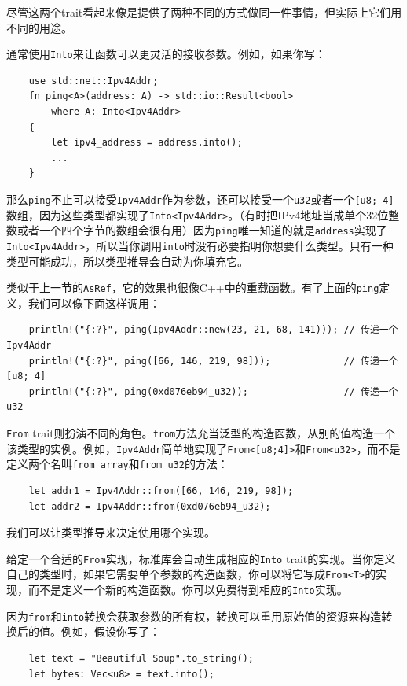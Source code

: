 尽管这两个trait看起来像是提供了两种不同的方式做同一件事情，但实际上它们用不同的用途。

通常使用\texttt{Into}来让函数可以更灵活的接收参数。例如，如果你写：
\begin{verbatim}
    use std::net::Ipv4Addr;
    fn ping<A>(address: A) -> std::io::Result<bool>
        where A: Into<Ipv4Addr>
    {
        let ipv4_address = address.into();
        ...
    }
\end{verbatim}

那么\texttt{ping}不止可以接受\texttt{Ipv4Addr}作为参数，还可以接受一个\texttt{u32}或者一个\texttt{[u8; 4]}数组，因为这些类型都实现了\texttt{Into<Ipv4Addr>}。（有时把IPv4地址当成单个32位整数或者一个四个字节的数组会很有用）因为\texttt{ping}唯一知道的就是\texttt{address}实现了\texttt{Into<Ipv4Addr>}，所以当你调用\texttt{into}时没有必要指明你想要什么类型。只有一种类型可能成功，所以类型推导会自动为你填充它。

类似于上一节的\texttt{AsRef}，它的效果也很像C++中的重载函数。有了上面的\texttt{ping}定义，我们可以像下面这样调用：
\begin{verbatim}
    println!("{:?}", ping(Ipv4Addr::new(23, 21, 68, 141))); // 传递一个Ipv4Addr
    println!("{:?}", ping([66, 146, 219, 98]));             // 传递一个[u8; 4]
    println!("{:?}", ping(0xd076eb94_u32));                 // 传递一个u32
\end{verbatim}

\texttt{From} trait则扮演不同的角色。\texttt{from}方法充当泛型的构造函数，从别的值构造一个该类型的实例。例如，\texttt{Ipv4Addr}简单地实现了\texttt{From<[u8;4]>}和\texttt{From<u32>}，而不是定义两个名叫\texttt{from\_array}和\texttt{from\_u32}的方法：
\begin{verbatim}
    let addr1 = Ipv4Addr::from([66, 146, 219, 98]);
    let addr2 = Ipv4Addr::from(0xd076eb94_u32);
\end{verbatim}

我们可以让类型推导来决定使用哪个实现。

给定一个合适的\texttt{From}实现，标准库会自动生成相应的\texttt{Into} trait的实现。当你定义自己的类型时，如果它需要单个参数的构造函数，你可以将它写成\texttt{From<T>}的实现，而不是定义一个新的构造函数。你可以免费得到相应的\texttt{Into}实现。

因为\texttt{from}和\texttt{into}转换会获取参数的所有权，转换可以重用原始值的资源来构造转换后的值。例如，假设你写了：
\begin{verbatim}
    let text = "Beautiful Soup".to_string();
    let bytes: Vec<u8> = text.into();
\end{verbatim}

